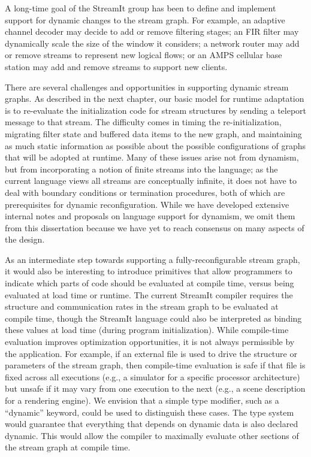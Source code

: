 
\mybegin

  A long-time goal of
  the StreamIt group has been to define and implement support for
  dynamic changes to the stream graph.  For example, an adaptive
  channel decoder may decide to add or remove filtering stages; an FIR
  filter may dynamically scale the size of the window it considers; a
  network router may add or remove streams to represent new logical
  flows; or an AMPS cellular base station may add and remove streams
  to support new clients.

  There are several challenges and opportunities in supporting dynamic
  stream graphs.  As described in the next chapter, our basic model
  for runtime adaptation is to re-evaluate the initialization code for
  stream structures by sending a teleport message to that stream.  The
  difficulty comes in timing the re-initialization, migrating filter
  state and buffered data items to the new graph, and maintaining as
  much static information as possible about the possible
  configurations of graphs that will be adopted at runtime.  Many of
  these issues arise not from dynamism, but from incorporating a
  notion of finite streams into the language; as the current language
  views all streams are conceptually infinite, it does not have to
  deal with boundary conditions or termination procedures, both of
  which are prerequisites for dynamic reconfiguration.  While we have
  developed extensive internal notes and proposals on language support
  for dynamism, we omit them from this dissertation because we have
  yet to reach consensus on many aspects of the design.

  As an intermediate step towards supporting a fully-reconfigurable
  stream graph, it would also be interesting to introduce primitives
  that allow programmers to indicate which parts of code should be
  evaluated at compile time, versus being evaluated at load time or
  runtime.  The current StreamIt compiler requires the structure and
  communication rates in the stream graph to be evaluated at compile
  time, though the StreamIt language could also be interpreted as
  binding these values at load time (during program initialization).
  While compile-time evaluation improves optimization opportunities,
  it is not always permissible by the application.  For example, if an
  external file is used to drive the structure or parameters of the
  stream graph, then compile-time evaluation is safe if that file is
  fixed across all executions (e.g., a simulator for a specific
  processor architecture) but unsafe if it may vary from one execution
  to the next (e.g., a scene description for a rendering engine).  We
  envision that a simple type modifier, such as a ``dynamic'' keyword,
  could be used to distinguish these cases.  The type system would
  guarantee that everything that depends on dynamic data is also
  declared dynamic.  This would allow the compiler to maximally
  evaluate other sections of the stream graph at compile time.

